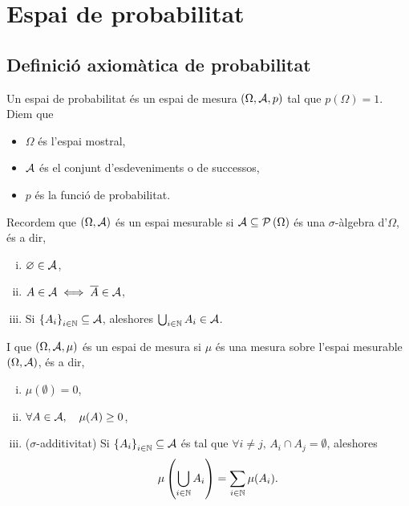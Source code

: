 \chapter{Espai de probabilitat}

\section{Definició axiomàtica de probabilitat}

\begin{defi}
    Un espai de probabilitat és un espai de mesura $(\Omega,\mathcal{A}, p)$ tal que $p(\Omega)=1$. Diem que 
    \begin{itemize}
        \item $\Omega$ és l'espai mostral,
        \item $\mathcal{A}$ és el conjunt d'esdeveniments o de successos,
        \item $p$ és la funció de probabilitat.
    \end{itemize}
\end{defi}

\begin{obs}
    Recordem que $\left(\Omega,\mathcal{A}\right)$ és un espai mesurable si $\mathcal{A}\subseteq \mathcal{P}\left(\Omega\right)$ és una $\sigma$-àlgebra d'$\Omega$, és a dir,
    \begin{enumerate}[i)]
        \item $\varnothing \in \mathcal{A}$,
        \item $A \in \mathcal{A} \iff \overline{A} \in \mathcal{A}$,
        \item Si $\left\{ A_i\right\} _{i\in\mathbb{N}}\subseteq \mathcal{A}$, aleshores $\bigcup_{i\in\mathbb{N}}{A_i} \in \mathcal{A}$.
    \end{enumerate}
    I que $\left(\Omega,\mathcal{A},\mu\right)$ és un espai de mesura si $\mu$ és una mesura sobre l'espai mesurable $\left(\Omega,\mathcal{A}\right)$, és a dir,
    \begin{enumerate}[i)]
        \item $\mu(\emptyset) = 0$,
        \item $\forall A \in \mathcal{A},\quad \mu(A) \ge0$,
        \item ($\sigma$-additivitat) Si $\left\{ A_i\right\}_{i\in\mathbb{N}}\subseteq\mathcal{A}$ és tal que $\forall i \neq j, \, A_i \cap A_j = \emptyset$,
        aleshores 
        \[
            \mu\left(\bigcup_{i\in\mathbb{N}}{A_i}\right) = \sum_{i\in\mathbb{N}}{\mu(A_i)}.
        \]
    \end{enumerate}
\end{obs}

